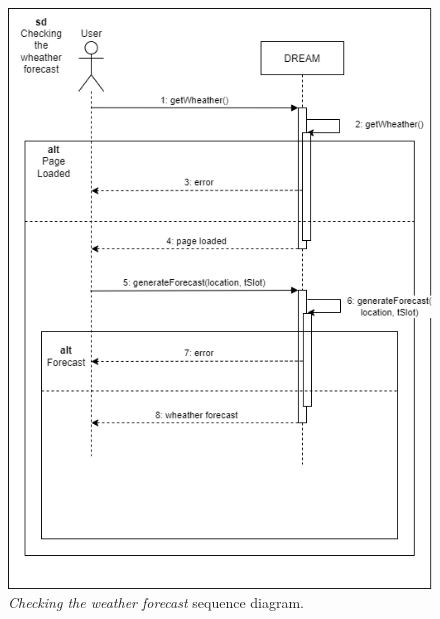 \begin{figure}[H]
    \centering
    \includegraphics[width=\linewidth]{Images/Use Case/UC14.png}
    \caption{\textit{Checking the weather forecast} sequence diagram.}
\end{figure}
\newpage

